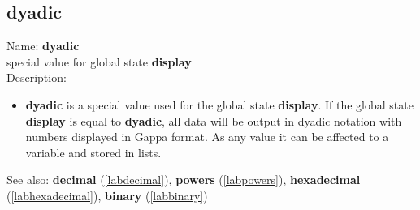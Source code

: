 \subsection{dyadic}
\label{labdyadic}
\noindent Name: \textbf{dyadic}\\
special value for global state \textbf{display}\\

\noindent Description: \begin{itemize}

\item \textbf{dyadic} is a special value used for the global state \textbf{display}.
   If the global state \textbf{display} is equal to \textbf{dyadic}, all data will
   be output in dyadic notation with numbers displayed in Gappa format.
   As any value it can be affected to a variable and stored in lists.
\end{itemize}
See also: \textbf{decimal} (\ref{labdecimal}), \textbf{powers} (\ref{labpowers}), \textbf{hexadecimal} (\ref{labhexadecimal}), \textbf{binary} (\ref{labbinary})
